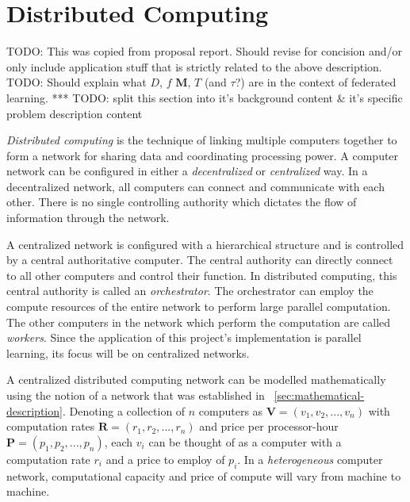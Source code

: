 \documentclass[../mthe-493-final-project.tex]{subfiles}
\begin{document}

    \section{Distributed Computing}
    \label{sec:Distributed-Computing}

    TODO: This was copied from proposal report. Should revise for concision and/or only include application stuff that is strictly related to the above description.
    TODO: Should explain what $D$, $f$ $\mathbf{M}$, $T$ (and $\tau$?) are in the context of federated learning.
    ***
    TODO: split this section into it's background content & it's specific problem description content

    \textit{Distributed computing} is the technique of linking multiple computers together to form a network for sharing data and coordinating processing power. A computer network can be configured in either a \textit{decentralized} or \textit{centralized} way. In a decentralized network, all computers can connect and communicate with each other. There is no single controlling authority which dictates the flow of information through the network.

    A centralized network is configured with a hierarchical structure and is controlled by a central authoritative computer. The central authority can directly connect to all other computers and control their function. In distributed computing, this central authority is called an \textit{orchestrator}. The orchestrator can employ the compute resources of the entire network to perform large parallel computation. The other computers in the network which perform the computation are called \textit{workers}. Since the application of this project's implementation is parallel learning, its focus will be on centralized networks.

    A centralized distributed computing network can be modelled mathematically using the notion of a network that was established in ~\autoref{sec:mathematical-description}. Denoting a collection of $n$ computers as $\mathbf{V} = (v_1, v_2, ..., v_n)$ with computation rates $\mathbf{R} = (r_1, r_2, ..., r_n)$ and price per processor-hour $\mathbf{P} = (p_1, p_2, ..., p_n)$, each $v_i$ can be thought of as a computer with a computation rate $r_i$ and a price to employ of $p_i$. In a \textit{heterogeneous} computer network, computational capacity and price of compute will vary from machine to machine.
\end{document}
